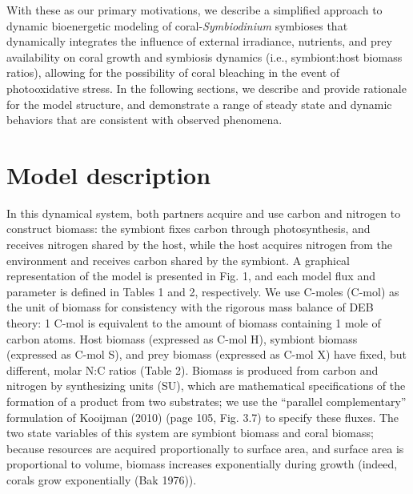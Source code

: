 \documentclass[]{elsarticle} %
\begin{document}
With these as our primary motivations, we describe a simplified approach
to dynamic bioenergetic modeling of coral-\emph{Symbiodinium} symbioses
that dynamically integrates the influence of external irradiance,
nutrients, and prey availability on coral growth and symbiosis dynamics
(i.e., symbiont:host biomass ratios), allowing for the possibility of
coral bleaching in the event of photooxidative stress. In the following
sections, we describe and provide rationale for the model structure, and
demonstrate a range of steady state and dynamic behaviors that are
consistent with observed phenomena.

\section{Model description}\label{model-description}

In this dynamical system, both partners acquire and use carbon and
nitrogen to construct biomass: the symbiont fixes carbon through
photosynthesis, and receives nitrogen shared by the host, while the host
acquires nitrogen from the environment and receives carbon shared by the
symbiont. A graphical representation of the model is presented in Fig.
1, and each model flux and parameter is defined in Tables 1 and 2,
respectively. We use C-moles (C-mol) as the unit of biomass for
consistency with the rigorous mass balance of DEB theory: 1 C-mol is
equivalent to the amount of biomass containing 1 mole of carbon atoms.
Host biomass (expressed as C-mol H), symbiont biomass (expressed as
C-mol S), and prey biomass (expressed as C-mol X) have fixed, but
different, molar N:C ratios (Table 2). Biomass is produced from carbon
and nitrogen by synthesizing units (SU), which are mathematical
specifications of the formation of a product from two substrates; we use
the ``parallel complementary'' formulation of Kooijman (2010) (page 105,
Fig. 3.7) to specify these fluxes. The two state variables of this
system are symbiont biomass and coral biomass; because resources are
acquired proportionally to surface area, and surface area is
proportional to volume, biomass increases exponentially during growth
(indeed, corals grow exponentially (Bak 1976)).
\end{document}
